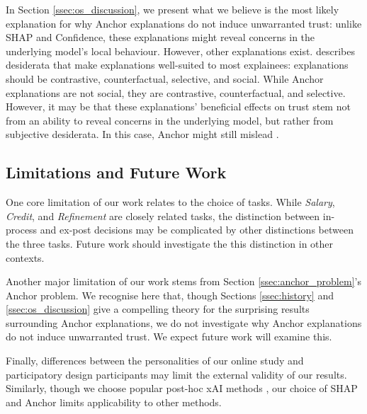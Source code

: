 In Section \ref{ssec:os_discussion}, we present what we believe is the most likely explanation for why Anchor explanations do not induce unwarranted trust: unlike SHAP and Confidence, these explanations might reveal concerns in the underlying model's local behaviour. However, other explanations exist. \textcite{miller_explanation_2017} describes desiderata that make explanations well-suited to most explainees: explanations should be contrastive, counterfactual, selective, and social. While Anchor explanations are not social, they are contrastive, counterfactual, and selective. However, it may be that these explanations' beneficial effects on trust stem not from an ability to reveal concerns in the underlying model, but rather from subjective desiderata. In this case, Anchor might still mislead \cite{Lipton}.

\subsection{Limitations and Future Work}
One core limitation of our work relates to the choice of tasks. While \emph{Salary}, \emph{Credit}, and \emph{Refinement} are closely related tasks, the distinction between in-process and ex-post decisions may be complicated by other distinctions between the three tasks. Future work should investigate the this distinction in other contexts.

Another major limitation of our work stems from Section \ref{ssec:anchor_problem}'s Anchor problem. We recognise here that, though Sections \ref{ssec:history} and \ref{ssec:os_discussion} give a compelling theory for the surprising results surrounding Anchor explanations, we do not investigate why Anchor explanations do not induce unwarranted trust. We expect future work will examine this.

Finally, differences between the personalities of our online study and participatory design participants may limit the external validity of our results. Similarly, though we choose popular post-hoc xAI methods \cite{barocas_hidden_2020,kumar_problems_2020,weerts_human-grounded_2019,ribeiro_nothing_2016}, our choice of SHAP and Anchor limits applicability to other methods.

